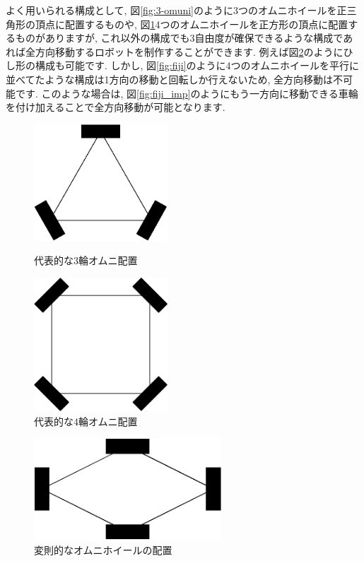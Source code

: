 よく用いられる構成として, 図\ref{fig:3-omuni}のように3つのオムニホイールを正三角形の頂点に配置するものや, 図\ref{fig:4-omuni}4つのオムニホイールを正方形の頂点に配置するものがありますが, これ以外の構成でも3自由度が確保できるような構成であれば全方向移動するロボットを制作することができます. 
例えば図\ref{fig:4-omuni-po}のようにひし形の構成も可能です. しかし, 図\ref{fig:fiji}のように4つのオムニホイールを平行に並べてたような構成は1方向の移動と回転しか行えないため, 全方向移動は不可能です. このような場合は, 図\ref{fig:fiji_imp}のようにもう一方向に移動できる車輪を付け加えることで全方向移動が可能となります.

\begin{figure}[h]
 \begin{minipage}{0.5\hsize}
  \begin{center}
   \includegraphics[width=50mm]{mecha/fig/3-omuni.eps}
  \end{center}
  \caption{代表的な3輪オムニ配置}
  \label{fig:3-omuni}
 \end{minipage}
 \begin{minipage}{0.5\hsize}
  \begin{center}
   \includegraphics[width=50mm]{mecha/fig/4-omuni.eps}
  \end{center}
  \caption{代表的な4輪オムニ配置}
  \label{fig:4-omuni}
 \end{minipage}
\end{figure}

\begin{figure}[h]
  \centering
  \includegraphics[width=7cm]{mecha/fig/4-omuni-po.eps}
  \caption{変則的なオムニホイールの配置}
  \label{fig:4-omuni-po}
\end{figure}

